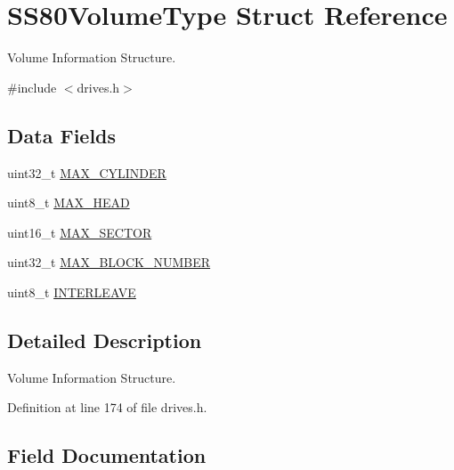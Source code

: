 \hypertarget{structSS80VolumeType}{}\section{S\+S80\+Volume\+Type Struct Reference}
\label{structSS80VolumeType}


Volume Information Structure.  




{\ttfamily \#include $<$drives.\+h$>$}

\subsection*{Data Fields}
\begin{DoxyCompactItemize}
\item 
uint32\+\_\+t \hyperlink{structSS80VolumeType_a53b65739246cea4e0d9095c88b03be8e}{M\+A\+X\+\_\+\+C\+Y\+L\+I\+N\+D\+ER}
\item 
uint8\+\_\+t \hyperlink{structSS80VolumeType_acc2870eb0a52a0e7f4dc57f036d903b1}{M\+A\+X\+\_\+\+H\+E\+AD}
\item 
uint16\+\_\+t \hyperlink{structSS80VolumeType_a0a367b3bf05801cdee9dadc8324a3bdb}{M\+A\+X\+\_\+\+S\+E\+C\+T\+OR}
\item 
uint32\+\_\+t \hyperlink{structSS80VolumeType_afe3db69c9ec54fa6d9fd48f3e6e9097b}{M\+A\+X\+\_\+\+B\+L\+O\+C\+K\+\_\+\+N\+U\+M\+B\+ER}
\item 
uint8\+\_\+t \hyperlink{structSS80VolumeType_accc9f011ff8edebcc6d781d1aa51f16d}{I\+N\+T\+E\+R\+L\+E\+A\+VE}
\end{DoxyCompactItemize}


\subsection{Detailed Description}
Volume Information Structure. 

Definition at line 174 of file drives.\+h.



\subsection{Field Documentation}
\mbox{\label{structSS80VolumeType_accc9f011ff8edebcc6d781d1aa51f16d}} 
